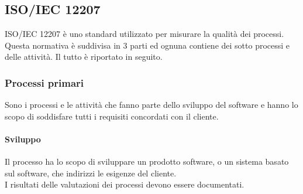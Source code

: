 \subsection{ISO/IEC 12207}
ISO/IEC 12207 è uno standard utilizzato per misurare la qualità dei processi. Questa normativa è suddivisa in 3 parti
ed ognuna contiene dei sotto processi e delle attività. Il tutto è riportato in seguito. 

\subsubsection{Processi primari}
Sono i processi e le attività che fanno parte dello sviluppo del software e hanno lo scopo di soddisfare tutti i requisiti concordati con il cliente.

\paragraph{Sviluppo}
Il processo ha lo scopo di sviluppare un prodotto software, o un sistema basato sul software, che indirizzi le esigenze del cliente. \\
I risultati delle valutazioni dei processi devono essere documentati.
